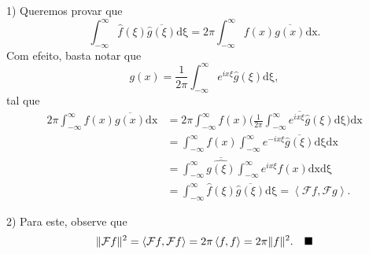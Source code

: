 \documentclass[../pde_notes.tex]{subfiles}
\begin{document}
\begin{proof*}
	1) Queremos provar que
	\[
		\int_{-\infty}^{\infty}\hat{f}(\xi )\overline{\hat{g}(\xi )} \mathrm{d\xi } = 2\pi \int_{-\infty}^{\infty}f(x)\overline{g(x)} \mathrm{dx}.
	\]
	Com efeito, basta notar que
	\[
		g(x) = \frac{1}{2\pi }\int_{-\infty}^{\infty}e^{ix\xi }\hat{g}(\xi ) \mathrm{d\xi },
	\]
	tal que
	\begin{align*}
		2\pi \int_{-\infty}^{\infty}f(x)\overline{g(x)} \mathrm{dx} & = 2\pi \int_{-\infty}^{\infty}f(x)\overline{\biggl(\frac{1}{2\pi }\int_{-\infty}^{\infty}e^{ix\xi }\hat{g}(\xi ) \mathrm{d\xi }\biggr)} \mathrm{dx} \\
		                                                            & = \int_{-\infty}^{\infty}f(x)\int_{-\infty}^{\infty}e^{-ix\xi }\overline{\hat{g}(\xi )} \mathrm{d\xi } \mathrm{dx}                                  \\
		                                                            & = \int_{-\infty}^{\infty}\overline{\hat{g(\xi )}}\int_{-\infty}^{\infty}e^{ix\xi }f(x) \mathrm{dx} \mathrm{d\xi }                                   \\
		                                                            & = \int_{-\infty}^{\infty}\hat{f}(\xi )\overline{\hat{g}(\xi )} \mathrm{d\xi } = \left< \mathcal{F}f, \mathcal{F}g \right>.
	\end{align*}

	2) Para este, observe que
	\[
		\Vert \mathcal{F}f \Vert^{2} = \left< \mathcal{F}f,\mathcal{F}f\right> = 2\pi \left< f, f \right> = 2\pi \Vert f \Vert^{2}.\quad \text{$\blacksquare$}
	\]
\end{proof*}
\end{document}

